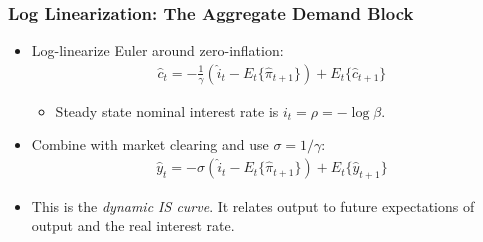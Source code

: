 \documentclass[11pt,aspectratio=169,xcolor={dvipsnames},hyperref={pdftex,pdfpagemode=UseNone,hidelinks,pdfdisplaydoctitle=true},usepdftitle=false]{beamer}
\begin{document}

\begin{frame}
\frametitle{Log Linearization: The Aggregate Demand Block
}
\begin{itemize}
	\item Log-linearize Euler around zero-inflation:
	\begin{align*}
		\hat{c}_t=-\frac{1}{\gamma}\left(\hat{i}_t-E_t\{\hat{\pi}_{t+1}\}\right)+E_t\{\hat{c}_{t+1}\}
	\end{align*}
	\begin{itemize}
		\item Steady state nominal interest rate is $i_t = \rho = -\log \beta$.
	\end{itemize}
	\item Combine with market clearing and use $\sigma=1/\gamma$:
	\begin{align*}
		\hat{y}_t=-\sigma\left(\hat{i}_t-E_t\{\hat{\pi}_{t+1}\}\right)+E_t\{\hat{y}_{t+1}\}
	\end{align*}
	\item This is the \emph{dynamic IS curve}. It relates output to future expectations of output and the real interest rate.
\end{itemize}
\end{frame}
\end{document}
